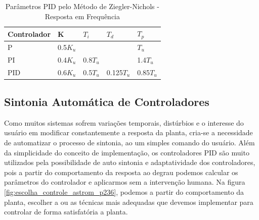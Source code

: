 \begin{table}
  \caption{Parâmetros PID pelo Método de Ziegler-Nichols - Resposta em Frequência}
  \label{tab:Ziegler-Nichols-freq}
  \centering%
  \begin{minipage}{.52\textwidth}
    \begin{tabular*}{\textwidth}{lllll}
      \hline
      {Controlador} & {K} & {$T_i$} & {$T_d$}& {$T_p$}\\ \hline
      \hline
      P    &  0.5$K_u$   &           &             & $T_u$  \\ 
      PI   &  0.4$K_u$   & 0.8$T_u$  &             & 1.4$T_u$ \\
      PID  &  0.6$K_u$   & 0.5$T_u$  & 0.125$T_u$  & 0.85$T_u$  \\ \hline
    \end{tabular*}
  \end{minipage}
\end{table}



\subsection{Sintonia Automática de Controladores}

Como muitos sistemas sofrem variações temporais, distúrbios e o interesse do usuário em modificar constantemente a resposta da planta, cria-se a necessidade de automatizar o processo de sintonia, ao um simples comando do usuário. Além da simplicidade do conceito de implementação, os controladores PID são muito utilizados pela possibilidade de auto sintonia e adaptatividade dos controladores, pois a partir do comportamento da resposta ao degrau podemos calcular os parâmetros do controlador e aplicarmos sem a intervenção humana\cite{Astrom1995}. Na figura \ref{fig:escolha_controle_astrom_p236}, podemos a partir do comportamento da planta, escolher a ou as técnicas mais adequadas que devemos implementar para controlar de forma satisfatória a planta.

